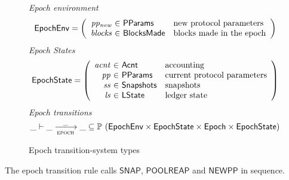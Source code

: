 \begin{figure}[htb]
  \emph{Epoch environment}
  \begin{equation*}
    \EpochEnv =
    \left(
      \begin{array}{r@{~\in~}ll}
        \var{pp_{new}} & \PParams & \text{new protocol parameters}\\
        \var{blocks} & \BlocksMade & \text{blocks made in the epoch}\\
      \end{array}
    \right)
  \end{equation*}
  \emph{Epoch States}
  \begin{equation*}
    \EpochState =
    \left(
      \begin{array}{r@{~\in~}ll}
        \var{acnt} & \Acnt & \text{accounting}\\
        \var{pp} & \PParams & \text{current protocol parameters}\\
        \var{ss} & \Snapshots & \text{snapshots}\\
        \var{ls} & \LState & \text{ledger state}\\
      \end{array}
    \right)
  \end{equation*}
  \emph{Epoch transitions}
  \begin{equation*}
    \_ \vdash
    \var{\_} \trans{epoch}{\_} \var{\_}
    \subseteq \powerset (\EpochEnv \times \EpochState \times \Epoch \times \EpochState)
  \end{equation*}
  \caption{Epoch transition-system types}
  \label{fig:ts-types:epoch}
\end{figure}


The epoch transition rule calls $\mathsf{SNAP}$, $\mathsf{POOLREAP}$ and $\mathsf{NEWPP}$
in sequence.

